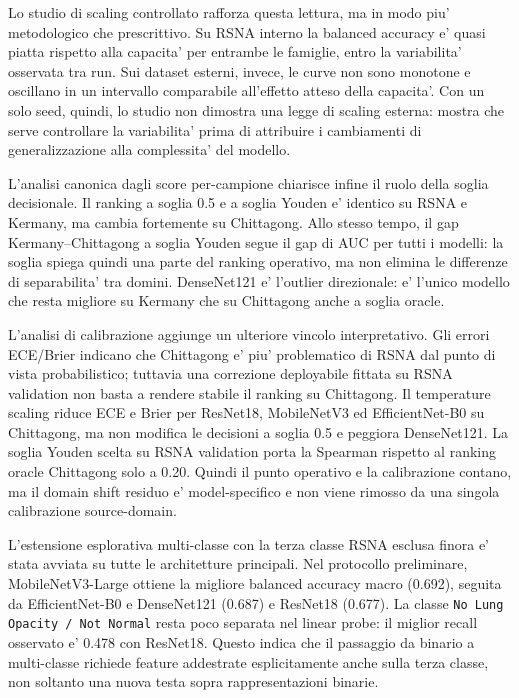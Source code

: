 \documentclass[11pt,a4paper]{article}
\newcommand{\balacc}{balanced accuracy}
\begin{document}
Lo studio di scaling controllato rafforza questa lettura, ma in modo piu'
metodologico che prescrittivo. Su RSNA interno la \balacc{} e' quasi piatta
rispetto alla capacita' per entrambe le famiglie, entro la variabilita' osservata
tra run. Sui dataset esterni, invece, le curve non sono monotone e oscillano in
un intervallo comparabile all'effetto atteso della capacita'. Con un solo seed,
quindi, lo studio non dimostra una legge di scaling esterna: mostra che serve
controllare la variabilita' prima di attribuire i cambiamenti di generalizzazione
alla complessita' del modello.

L'analisi canonica dagli score per-campione chiarisce infine il ruolo della
soglia decisionale. Il ranking a soglia 0.5 e a soglia Youden e' identico su
RSNA e Kermany, ma cambia fortemente su Chittagong. Allo stesso tempo, il gap
Kermany--Chittagong a soglia Youden segue il gap di AUC per tutti i modelli:
la soglia spiega quindi una parte del ranking operativo, ma non elimina le
differenze di separabilita' tra domini. DenseNet121 e' l'outlier direzionale:
e' l'unico modello che resta migliore su Kermany che su Chittagong anche a
soglia oracle.

L'analisi di calibrazione aggiunge un ulteriore vincolo interpretativo. Gli
errori ECE/Brier indicano che Chittagong e' piu' problematico di RSNA dal punto
di vista probabilistico; tuttavia una correzione deployabile fittata su RSNA
validation non basta a rendere stabile il ranking su Chittagong. Il temperature
scaling riduce ECE e Brier per ResNet18, MobileNetV3 ed EfficientNet-B0 su
Chittagong, ma non modifica le decisioni a soglia 0.5 e peggiora DenseNet121.
La soglia Youden scelta su RSNA validation porta la Spearman rispetto al ranking
oracle Chittagong solo a 0.20. Quindi il punto operativo e la calibrazione
contano, ma il domain shift residuo e' model-specifico e non viene rimosso da
una singola calibrazione source-domain.

L'estensione esplorativa multi-classe con la terza classe RSNA esclusa finora e'
stata avviata su tutte le architetture principali. Nel protocollo preliminare,
MobileNetV3-Large ottiene la migliore \balacc{} macro (0.692), seguita da
EfficientNet-B0 e DenseNet121 (0.687) e ResNet18 (0.677). La classe
\texttt{No Lung Opacity / Not Normal} resta poco separata nel linear probe: il
miglior recall osservato e' 0.478 con ResNet18. Questo indica che il passaggio
da binario a multi-classe richiede feature addestrate esplicitamente anche sulla
terza classe, non soltanto una nuova testa sopra rappresentazioni binarie.
\end{document}
